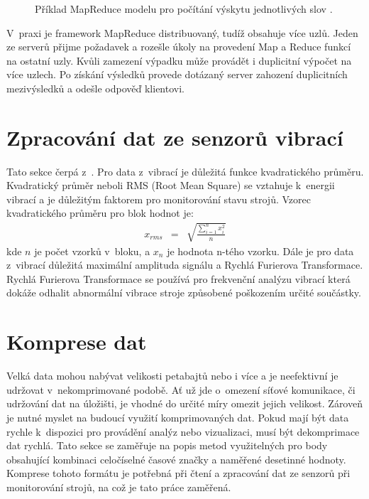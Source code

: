 \begin{figure}[h]
  \centering
  \caption{Příklad MapReduce modelu pro počítání výskytu jednotlivých slov \cite{MapReduce}.}\label{pic:MapReduce}
\end{figure}

V~praxi je framework MapReduce distribuovaný, tudíž obsahuje více uzlů. Jeden ze serverů přijme požadavek a rozešle úkoly na provedení Map a Reduce funkcí na ostatní uzly. Kvůli zamezení výpadku může provádět i duplicitní výpočet na více uzlech. Po získání výsledků provede dotázaný server zahození duplicitních mezivýsledků a odešle odpověď klientovi.

\section{Zpracování dat ze senzorů vibrací}\label{sec:vibrationAggregation}
Tato sekce čerpá z~\cite{vibrationData}. Pro data z~vibrací je důležitá funkce kvadratického průměru. Kvadratický průměr neboli RMS (Root Mean Square) se vztahuje k~energii vibrací a je důležitým faktorem pro monitorování stavu strojů. Vzorec kvadratického průměru pro blok hodnot je: 
\begin{eqnarray}\label{eq:root_mean_square}
  x_{rms} & = & \sqrt{\frac{\sum_{i=1}^{n} x_i^2}{n}}
\end{eqnarray}
kde $n$ je počet vzorků v~bloku, a $x_n$ je hodnota n-tého vzorku. Dále je pro data z~vibrací důležitá maximální amplituda signálu a Rychlá Furierova Transformace. Rychlá Furierova Transformace se používá pro frekvenční analýzu vibrací která dokáže odhalit abnormální vibrace stroje způsobené poškozením určité součástky.

\section{Komprese dat}\label{sec:compression}
Velká data mohou nabývat velikosti petabajtů nebo i více a je neefektivní je udržovat v~nekomprimované podobě. Ať už jde o~omezení síťové komunikace, či udržování dat na úložišti, je vhodné do určité míry omezit jejich velikost. Zároveň je nutné myslet na budoucí využití komprimovaných dat. Pokud mají být data rychle k~dispozici pro provádění analýz nebo vizualizaci, musí být dekomprimace dat rychlá. Tato sekce se zaměřuje na popis metod využitelných pro body obsahující kombinaci celočíselné časové značky a naměřené desetinné hodnoty. Komprese tohoto formátu je potřebná při čtení a zpracování dat ze senzorů při monitorování strojů, na což je tato práce zaměřená.

